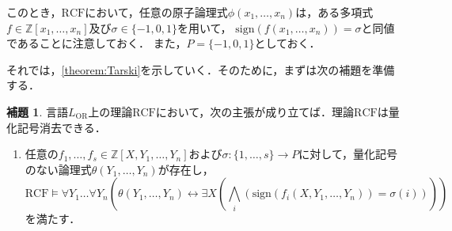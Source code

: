 \documentclass[uplatex, dvipdfmx]{jsarticle}
\numberwithin{equation}{section}
\newcommand{\Z}{\mathbb{Z}}
\newcommand{\RCF}{\mathrm{RCF}}
\newcommand{\sign}{\mathrm{sign}}
\newcommand{\map}[3]{{#1}\colon{#2}\rightarrow{#3}}
\theoremstyle{definition}
\newtheorem{lemma}[definition]{補題}
\begin{document}
このとき，$\RCF$において，任意の原子論理式$\phi(x_1, \dots, x_n)$は，ある多項式$f \in \Z[x_1, \dots, x_n]$及び$\sigma \in \{-1, 0, 1\}$を用いて，
$\sign(f(x_1, \dots, x_n)) = \sigma$と同値であることに注意しておく．
また，$P = \{-1, 0, 1\}$としておく．

それでは，\cref{theorem:Tarski}を示していく．そのために，まずは次の補題を準備する．


\begin{lemma}\label{lemma:qe_simplify}
     言語$L_\mathrm{OR}$上の理論$\RCF$において，次の主張が成り立てば．理論$\RCF$は量化記号消去できる．

     \begin{enumerate}
          \item \label{qe_1}
          任意の$f_1, \dots, f_s \in \Z[X, Y_1, \dots, Y_n]$および$\map{\sigma}{\{1,\dots, s\}}{P}$に対して，量化記号のない論理式$\theta(Y_1, \dots, Y_n)$が存在し，
          \begin{equation}
               \RCF \models \forall Y_1 \dots \forall Y_n ( \theta(Y_1, \dots, Y_n) \leftrightarrow \exists X(\bigwedge_i (\sign(f_i(X,Y_1, \dots, Y_n))= \sigma(i))) )
          \end{equation}
          を満たす．
     \end{enumerate}
\end{lemma}
\end{document}
